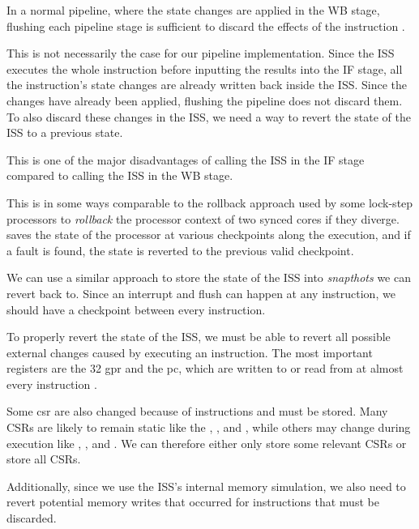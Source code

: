 In a normal pipeline, where the state changes are applied in the WB stage, flushing each pipeline stage is sufficient to discard the effects of the instruction \cite[Ch. 4]{pattersonComputerOrganizationDesign2021}.

This is not necessarily the case for our pipeline implementation. Since the ISS executes the whole instruction before inputting the results into the IF stage, all the instruction's state changes are already written back inside the ISS. Since the changes have already been applied, flushing the pipeline does not discard them. To also discard these changes in the ISS, we need a way to revert the state of the ISS to a previous state.

This is one of the major disadvantages of calling the ISS in the IF stage compared to calling the ISS in the WB stage.


This is in some ways comparable to the rollback approach used by some lock-step processors \cite{marquesLockVHeterogeneousFault2021, liDuckCoreFaultTolerantProcessor2021, nikiemaDesignLowComplexity2023} to \textit{rollback} the processor context of two synced cores if they diverge. \textcite{marquesLockVHeterogeneousFault2021} saves the state of the processor at various \glspl{checkpoint} along the execution, and if a fault is found, the state is reverted to the previous valid checkpoint.

We can use a similar approach to store the state of the ISS into \textit{snapthots} we can revert back to. Since an interrupt and flush can happen at any instruction, we should have a checkpoint between every instruction.


To properly revert the state of the ISS, we must be able to revert all possible external changes caused by executing an instruction. The most important registers are the 32 \acrfull{gpr} and the \acrfull{pc}, which are written to or read from at almost every instruction \cite{watermanRISCVInstructionSet2019}.

Some \acrfull{csr} are also changed because of instructions and must be stored. Many CSRs are likely to remain static like the , , and , while others may change during execution like , , and  \cite{watermanRISCVInstructionSet2021}. We can therefore either only store some relevant CSRs or store all CSRs.

Additionally, since we use the ISS's internal memory simulation, we also need to revert potential memory writes that occurred for instructions that must be discarded.


